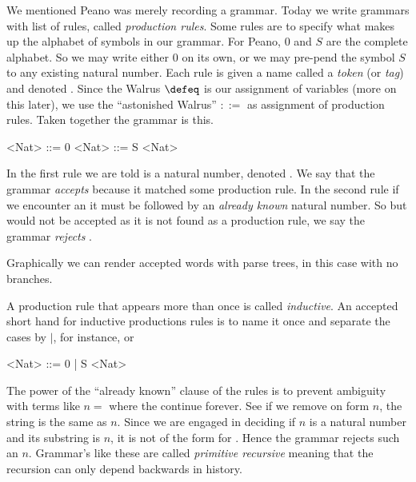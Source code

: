 We mentioned Peano was merely recording a grammar.  Today we write grammars with 
list of rules, called \emph{production rules}.  Some rules are to specify 
what makes up the alphabet of symbols in our grammar.  For Peano, $0$ and $S$
are the complete alphabet.  So we may write either $0$ on its own, or 
we may pre-pend the symbol $S$ to any existing natural number.  
Each rule is given a name called a \emph{token} (or \emph{tag}) and 
denoted . Since the Walrus
$\defeq$ is our assignment of variables (more on this later), 
we use the ``astonished Walrus'' $::=$
as assignment of production rules.   Taken together the grammar is this.
\begin{center}
\begin{gcode}[]
<Nat> ::= 0 
<Nat> ::= S <Nat>
\end{gcode}
\end{center}
In the first rule we are told  is a natural number, denoted
. We say that the grammar \emph{accepts}  because it matched
some production rule.  In the second rule if we encounter an  it must be
followed by an \emph{already known} natural number.  So  but
 would not be accepted as it is not found as a production rule, we say
the grammar \emph{rejects} .

Graphically we can render accepted words with parse trees, in this case with no branches.
\begin{center}
\end{center}

\begin{definition}
A production rule that appears more than once is called \emph{inductive}.
An accepted short hand for inductive productions rules is to name it once 
and separate the cases by $\mid$, for instance,
 or 
\begin{center}
\begin{gcode}[]
<Nat> ::= 0 
        | S <Nat>
\end{gcode}
\end{center}
\end{definition}



\begin{remark}
    The power of the ``already known'' clause of the rules is to prevent ambiguity 
    with terms like $n=$ where the  continue forever.
    See if we remove on  form $n$, the string is the same as $n$.
    Since we are engaged in deciding if $n$ is a natural number and its substring 
    is $n$, it is not of the form  for .  Hence the grammar 
    rejects such an $n$.  Grammar's like these are called \emph{primitive recursive}
    meaning that the recursion can only depend backwards 
    in history.
\end{remark}

